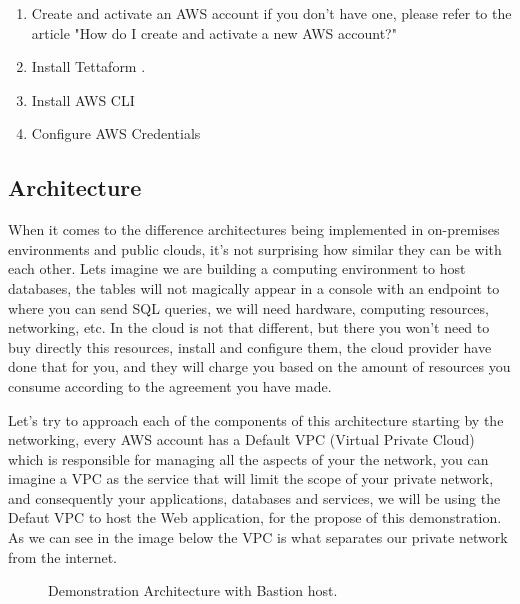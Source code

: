 \documentclass{article}
\begin{document}
\begin{enumerate}
\item Create and activate an AWS account if you don’t have one, please refer to the article "How do I create and activate a new AWS account?" \cite{createaccount}
\item Install Tettaform \cite{installterraform}. 
\item Install AWS CLI  \cite{installawscli}
\item Configure AWS Credentials \cite{configurecredentials}
\end{enumerate}

\subsection{Architecture}
When it comes to the difference architectures being implemented in on-premises environments and public clouds, it's not surprising how similar they can be with each other. Lets imagine we are building a computing environment to host databases, the tables will not magically appear in a console with an endpoint to where you can send SQL queries, we will need hardware, computing resources, networking, etc. In the cloud is not that different, but there you won't need to buy directly this resources, install and configure them, the cloud provider have done that for you, and they will charge you based on the amount of resources you consume according to the agreement you have made. 

Let's try to approach each of the components of this architecture starting by the networking, every AWS account has a Default VPC (Virtual Private Cloud) which is responsible for managing all the aspects of your the network, you can imagine a VPC as the service that will limit the scope of your private network, and consequently your applications, databases and services, we will be using the Defaut VPC to host the Web application, for the propose of this demonstration. As we can see in the image below the VPC is what separates our private network from the internet. 

\begin{figure}[hbt!]
\centering
\caption{\label{fig:Arqchitecture} Demonstration Architecture with Bastion host.}
\end{figure}
\end{document}
